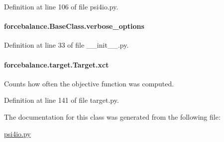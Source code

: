 Definition at line 106 of file psi4io.\-py.

\hypertarget{classforcebalance_1_1BaseClass_afd68efa29ccd2f320f4cf82198214aac}{
\paragraph[{verbose\-\_\-options}]{\setlength{\rightskip}{0pt plus 5cm}forcebalance.\-Base\-Class.\-verbose\-\_\-options\hspace{0.3cm}{\ttfamily [inherited]}}}\label{classforcebalance_1_1BaseClass_afd68efa29ccd2f320f4cf82198214aac}


Definition at line 33 of file \-\_\-\-\_\-init\-\_\-\-\_\-.\-py.

\hypertarget{classforcebalance_1_1target_1_1Target_aad2e385cfbf7b4a68f1c2cb41133fe82}{
\paragraph[{xct}]{\setlength{\rightskip}{0pt plus 5cm}forcebalance.\-target.\-Target.\-xct\hspace{0.3cm}{\ttfamily [inherited]}}}\label{classforcebalance_1_1target_1_1Target_aad2e385cfbf7b4a68f1c2cb41133fe82}


Counts how often the objective function was computed. 



Definition at line 141 of file target.\-py.



The documentation for this class was generated from the following file\-:\begin{DoxyCompactItemize}
\item 
\hyperlink{psi4io_8py}{psi4io.\-py}\end{DoxyCompactItemize}
